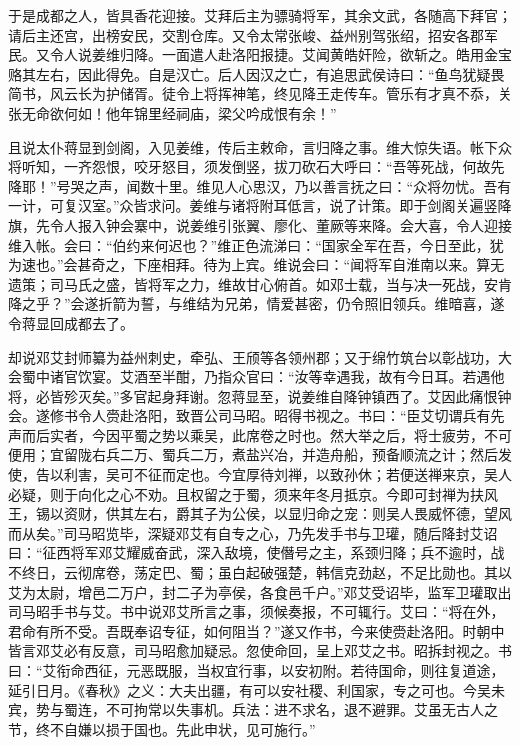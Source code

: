 于是成都之人，皆具香花迎接。艾拜后主为骠骑将军，其余文武，各随高下拜官；请后主还宫，出榜安民，交割仓库。又令太常张峻、益州别驾张绍，招安各郡军民。又令人说姜维归降。一面遣人赴洛阳报捷。艾闻黄皓奸险，欲斩之。皓用金宝赂其左右，因此得免。自是汉亡。后人因汉之亡，有追思武侯诗曰：“鱼鸟犹疑畏简书，风云长为护储胥。徒令上将挥神笔，终见降王走传车。管乐有才真不忝，关张无命欲何如！他年锦里经祠庙，梁父吟成恨有余！”

且说太仆蒋显到剑阁，入见姜维，传后主敕命，言归降之事。维大惊失语。帐下众将听知，一齐怨恨，咬牙怒目，须发倒竖，拔刀砍石大呼曰：“吾等死战，何故先降耶！”号哭之声，闻数十里。维见人心思汉，乃以善言抚之曰：“众将勿忧。吾有一计，可复汉室。”众皆求问。姜维与诸将附耳低言，说了计策。即于剑阁关遍竖降旗，先令人报入钟会寨中，说姜维引张翼、廖化、董厥等来降。会大喜，令人迎接维入帐。会曰：“伯约来何迟也？”维正色流涕曰：“国家全军在吾，今日至此，犹为速也。”会甚奇之，下座相拜。待为上宾。维说会曰：“闻将军自淮南以来。算无遗策；司马氏之盛，皆将军之力，维故甘心俯首。如邓士载，当与决一死战，安肯降之乎？”会遂折箭为誓，与维结为兄弟，情爱甚密，仍令照旧领兵。维暗喜，遂令蒋显回成都去了。

却说邓艾封师纂为益州刺史，牵弘、王颀等各领州郡；又于绵竹筑台以彰战功，大会蜀中诸官饮宴。艾酒至半酣，乃指众官曰：“汝等幸遇我，故有今日耳。若遇他将，必皆殄灭矣。”多官起身拜谢。忽蒋显至，说姜维自降钟镇西了。艾因此痛恨钟会。遂修书令人赍赴洛阳，致晋公司马昭。昭得书视之。书曰：“臣艾切谓兵有先声而后实者，今因平蜀之势以乘吴，此席卷之时也。然大举之后，将士疲劳，不可便用；宜留陇右兵二万、蜀兵二万，煮盐兴冶，并造舟船，预备顺流之计；然后发使，告以利害，吴可不征而定也。今宜厚待刘禅，以致孙休；若便送禅来京，吴人必疑，则于向化之心不劝。且权留之于蜀，须来年冬月抵京。今即可封禅为扶风王，锡以资财，供其左右，爵其子为公侯，以显归命之宠：则吴人畏威怀德，望风而从矣。”司马昭览毕，深疑邓艾有自专之心，乃先发手书与卫瓘，随后降封艾诏曰：“征西将军邓艾耀威奋武，深入敌境，使僭号之主，系颈归降；兵不逾时，战不终日，云彻席卷，荡定巴、蜀；虽白起破强楚，韩信克劲赵，不足比勋也。其以艾为太尉，增邑二万户，封二子为亭侯，各食邑千户。”邓艾受诏毕，监军卫瓘取出司马昭手书与艾。书中说邓艾所言之事，须候奏报，不可辄行。艾曰：“将在外，君命有所不受。吾既奉诏专征，如何阻当？”遂又作书，今来使赍赴洛阳。时朝中皆言邓艾必有反意，司马昭愈加疑忌。忽使命回，呈上邓艾之书。昭拆封视之。书曰：“艾衔命西征，元恶既服，当权宜行事，以安初附。若待国命，则往复道途，延引日月。《春秋》之义：大夫出疆，有可以安社稷、利国家，专之可也。今吴未宾，势与蜀连，不可拘常以失事机。兵法：进不求名，退不避罪。艾虽无古人之节，终不自嫌以损于国也。先此申状，见可施行。”

